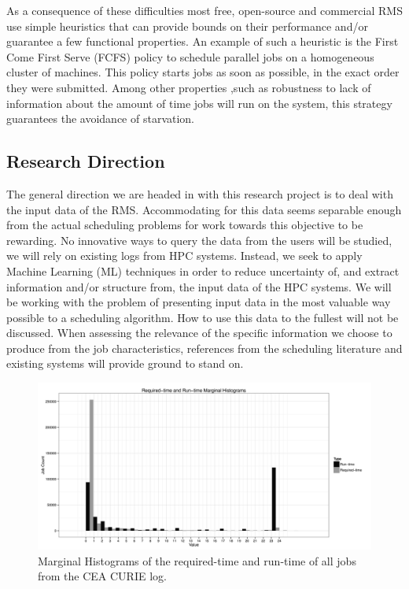 \documentclass{article}
\begin{document}
As a consequence of these difficulties most free, open-source and commercial RMS use simple heuristics that can provide bounds on their performance and/or guarantee a few functional properties.
An example of such a heuristic is the First Come First Serve (FCFS) policy to schedule parallel jobs on a homogeneous cluster of machines. This policy starts jobs as soon as possible, in the exact order they were submitted.
Among other properties ,such as robustness to lack of information about the amount of time jobs will run on the system, this strategy guarantees the avoidance of starvation.

\subsection{Research Direction}
The general direction we are headed in with this research project is to deal with the input data of the RMS.
Accommodating for this data seems separable enough from the actual scheduling problems for work towards this objective to be rewarding.
No innovative ways to query the data from the users will be studied, we will rely on existing logs from HPC systems. Instead, we seek to apply Machine Learning (ML) techniques in order to reduce uncertainty of, and extract information and/or structure from, the input data of the HPC systems.
We will be working with the problem of presenting input data in the most valuable way possible to a scheduling algorithm. How to use this data to the fullest will not be discussed.
When assessing the relevance of the specific information we choose to produce from the job characteristics, references from the scheduling literature and existing systems will provide ground to stand on.


\begin{figure}[b]
  \centering
  \includegraphics[width=\textwidth]{reqrun-0.png}
  \caption{Marginal Histograms of the required-time and run-time of all jobs from the CEA CURIE log.}
  \label{fig:_wall_run_for_report_pdf}
\end{figure}
\end{document}
